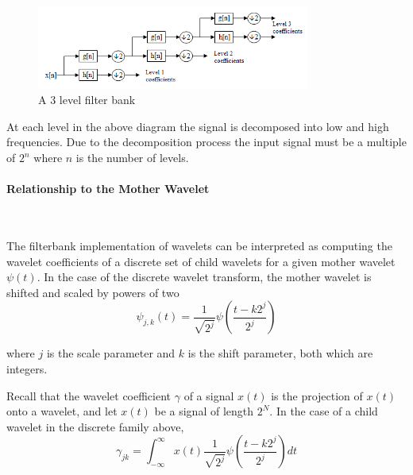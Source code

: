 \documentclass[a4paper,11pt]{article}
\begin{document}
    \begin{figure}[h]%
    \centering %
    \includegraphics[width=0.8\textwidth]{./Pic/WaveletsFilterBank.png}
    \caption{A $3$ level filter bank} 
    \label{fig:WaveletsFilterBank}  
    \end{figure}
\par At each level in the above diagram the signal is decomposed into low and high frequencies. Due to the decomposition process the input signal must be a multiple of $2^n$ where $n$ is the number of levels.


\paragraph{Relationship to the Mother Wavelet}
\textrm{\\}
\par The filterbank implementation of wavelets can be interpreted as computing the wavelet coefficients of a discrete set of child wavelets for a given mother wavelet $\psi(t)$. In the case of the discrete wavelet transform, the mother wavelet is shifted and scaled by powers of two
\begin{equation}
 \psi_{j,k}(t)= \frac{1}{\sqrt{2^j}} \psi \left( \frac{t - k2^j}{2^j} \right) 
\end{equation}

\par where $j$ is the scale parameter and $k$ is the shift parameter, both which are integers.

\par Recall that the wavelet coefficient $\gamma$ of a signal $x(t)$ is the projection of $x(t)$ onto a wavelet, and let $x(t)$ be a signal of length $2^N$. In the case of a child wavelet in the discrete family above,
\begin{equation}
 \gamma_{jk}=\int_{-\infty}^{\infty}x(t)  
 \frac{1}{\sqrt{2^j}}\psi\left(\frac{t-k2^j}{2^j} \right)dt 
\end{equation}
\end{document}
